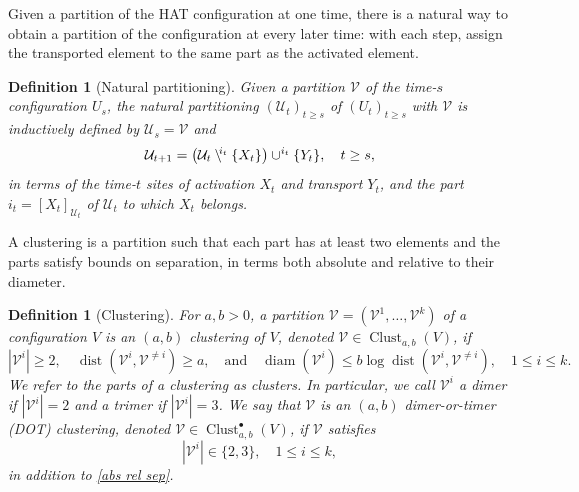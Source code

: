 \documentclass[11pt,reqno]{amsart}
\newtheorem{definition}[lemma]{Definition}
\theoremstyle{definition}
\numberwithin{equation}{section}
\newcommand{\1}{\mathbf{1}}
\DeclareMathOperator{\dist}{dist}
\DeclareMathOperator{\diam}{diam}
\newcommand{\sd}[1]{\setminus^{\hspace{-0.2em} #1}}
\newcommand{\UU}{\mathcal{U}}
\newcommand{\VV}{\mathcal{V}}
\DeclareMathOperator{\Clust}{\mathrm{Clust}}
\begin{document}
Given a partition of the HAT configuration at one time, there is a natural way to obtain a partition of the configuration at every later time: with each step, assign the transported element to the same part as the activated element.

\begin{definition}[Natural partitioning]\label{nat part}
Given a partition $\VV$ of the time-$s$ configuration $U_s$, the natural partitioning $(\UU_t)_{t \geq s}$ of $(U_t)_{t \geq s}$ with $\VV$ is inductively defined by $\UU_s = \VV$ and  
\begin{equation}\label{c with u}
\UU_{t+1} = \left( \UU_t \sd{i_t} \{X_t\} \right) \cup^{i_t} \{Y_t\}, \quad t \geq s,
\end{equation}
in terms of the time-$t$ sites of activation $X_t$ and transport $Y_t$, and the part $i_t = [X_t]_{\UU_t}$ of $\UU_t$ to which $X_t$ belongs.
\end{definition}



A clustering is a partition such that each part has at least two elements and the parts satisfy bounds on separation, in terms both absolute and relative to their diameter.

\begin{definition}[Clustering]\label{clustering def}
For $a, b > 0$, a partition $\VV = (\VV^1, \dots, \VV^k)$ of a configuration $V$ is an $(a,b)$ clustering of $V$, denoted $\VV \in \Clust_{a,b} (V)$, if
\begin{equation}\label{abs rel sep}
|\VV^i| \geq 2, \quad \dist (\VV^i, \VV^{\neq i}) \geq a, \quad \text{and} \quad \diam (\VV^i) \leq b \log \dist (\VV^i, \VV^{\neq i}), \quad 1 \leq i \leq k.
\end{equation}
We refer to the parts of a clustering as clusters. In particular, we call $\VV^i$ a dimer if $|\VV^i| = 2$ and a trimer if $|\VV^i| = 3$. We say that $\VV$ is an $(a,b)$ {\em dimer-or-timer} (DOT) clustering, denoted $\VV \in \Clust_{a,b}^\bullet (V)$, if $\VV$ satisfies
\begin{equation}\label{two or three elems}
|\VV^i| \in \{2,3\}, \quad 1 \leq i \leq k,
\end{equation}
in addition to \eqref{abs rel sep}.
\end{definition}
\end{document}
